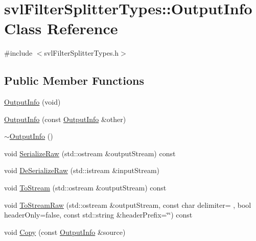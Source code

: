 \hypertarget{classsvl_filter_splitter_types_1_1_output_info}{}\section{svl\+Filter\+Splitter\+Types\+:\+:Output\+Info Class Reference}
\label{classsvl_filter_splitter_types_1_1_output_info}


{\ttfamily \#include $<$svl\+Filter\+Splitter\+Types.\+h$>$}

\subsection*{Public Member Functions}
\begin{DoxyCompactItemize}
\item 
\hyperlink{classsvl_filter_splitter_types_1_1_output_info_ab97210df69e7f46916349f31bb2d545d}{Output\+Info} (void)
\item 
\hyperlink{classsvl_filter_splitter_types_1_1_output_info_ab04c42959511415b50087496d092a01a}{Output\+Info} (const \hyperlink{classsvl_filter_splitter_types_1_1_output_info}{Output\+Info} \&other)
\item 
\hyperlink{classsvl_filter_splitter_types_1_1_output_info_ab09d5ae63d0dadf7c132b75a7496beb2}{$\sim$\+Output\+Info} ()
\item 
void \hyperlink{classsvl_filter_splitter_types_1_1_output_info_aac5c3e17cd59b05f79cbc505caa7d572}{Serialize\+Raw} (std\+::ostream \&output\+Stream) const 
\item 
void \hyperlink{classsvl_filter_splitter_types_1_1_output_info_abf49c2f9e38541294960e45de69c93df}{De\+Serialize\+Raw} (std\+::istream \&input\+Stream)
\item 
void \hyperlink{classsvl_filter_splitter_types_1_1_output_info_a918726c7bcd5df9b8986038295b8c227}{To\+Stream} (std\+::ostream \&output\+Stream) const 
\item 
void \hyperlink{classsvl_filter_splitter_types_1_1_output_info_a6883a04d20297de0d797362ca7058de9}{To\+Stream\+Raw} (std\+::ostream \&output\+Stream, const char delimiter= \textquotesingle{} \textquotesingle{}, bool header\+Only=false, const std\+::string \&header\+Prefix=\char`\"{}\char`\"{}) const 
\item 
void \hyperlink{classsvl_filter_splitter_types_1_1_output_info_a8b413c7ed4f052ee1be8086967263aa8}{Copy} (const \hyperlink{classsvl_filter_splitter_types_1_1_output_info}{Output\+Info} \&source)

\end{DoxyCompactItemize}

